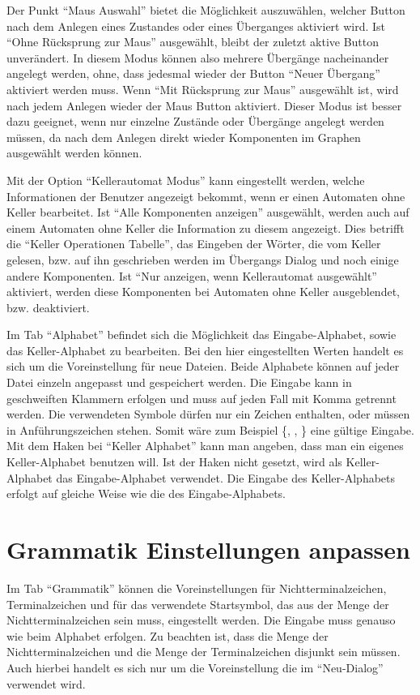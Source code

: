 Der Punkt "`Maus Auswahl"' bietet die Möglichkeit auszuwählen, welcher Button nach
dem Anlegen eines Zustandes oder eines Überganges aktiviert wird. Ist "`Ohne
Rücksprung zur Maus"' ausgewählt, bleibt der zuletzt aktive Button unverändert.
In diesem Modus können also mehrere Übergänge nacheinander angelegt werden, ohne,
dass jedesmal wieder der Button "`Neuer Übergang"' aktiviert werden muss. Wenn
"`Mit Rücksprung zur Maus"' ausgewählt ist, wird nach jedem Anlegen wieder der
Maus Button aktiviert. Dieser Modus ist besser dazu geeignet, wenn nur einzelne
Zustände oder Übergänge angelegt werden müssen, da nach dem Anlegen direkt wieder
Komponenten im Graphen ausgewählt werden können.\vspace{10pt}

Mit der Option "`Kellerautomat Modus"' kann eingestellt werden, welche Informationen
der Benutzer angezeigt bekommt, wenn er einen Automaten ohne Keller bearbeitet. Ist
"`Alle Komponenten anzeigen"' ausgewählt, werden auch auf einem Automaten ohne Keller
die Information zu diesem angezeigt. Dies betrifft die "`Keller Operationen Tabelle"',
das Eingeben der Wörter, die vom Keller gelesen, bzw. auf ihn geschrieben
werden im Übergangs Dialog und noch einige andere Komponenten. Ist "`Nur anzeigen, wenn
Kellerautomat ausgewählt"' aktiviert, werden diese Komponenten bei Automaten ohne
Keller ausgeblendet, bzw. deaktiviert.\vspace{10pt}

Im Tab "`Alphabet"' befindet sich die Möglichkeit das Eingabe-Alphabet, sowie das
Keller-Alphabet zu bearbeiten. Bei den hier eingestellten Werten handelt es sich
um die Voreinstellung für neue Dateien. Beide Alphabete können auf jeder Datei
einzeln angepasst und gespeichert werden. Die Eingabe kann in geschweiften
Klammern erfolgen und muss auf jeden Fall mit Komma getrennt werden. Die
verwendeten Symbole dürfen nur ein Zeichen enthalten, oder müssen in
Anführungszeichen stehen. Somit wäre zum Beispiel \{, , 
\} eine gültige Eingabe. Mit dem Haken bei "`Keller Alphabet"' kann
man angeben, dass man ein eigenes Keller-Alphabet benutzen will. Ist der Haken
nicht gesetzt, wird als Keller-Alphabet das Eingabe-Alphabet verwendet. Die
Eingabe des Keller-Alphabets erfolgt auf gleiche Weise wie die des
Eingabe-Alphabets.


\section{Grammatik Einstellungen anpassen}

Im Tab "`Grammatik"' können die Voreinstellungen für Nichtterminalzeichen,
Terminalzeichen und für das verwendete Startsymbol, das aus der Menge der
Nichtterminalzeichen sein muss, eingestellt werden. Die Eingabe muss genauso wie
beim Alphabet erfolgen. Zu beachten ist, dass die Menge der Nichtterminalzeichen
und die Menge der Terminalzeichen disjunkt sein müssen. Auch hierbei handelt es
sich nur um die Voreinstellung die im "`Neu-Dialog"' verwendet wird.